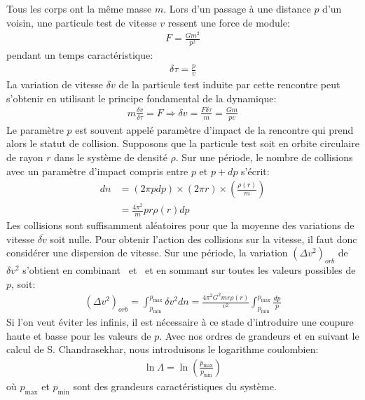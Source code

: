 Tous les corps ont la même masse $m$. Lors d'un passage à une distance $p$ d'un voisin, une particule test de vitesse $v$ ressent une force de module:
\begin{align*}
	F=\frac{Gm^{2}}{p^{2}}%
\end{align*}
pendant un temps caractéristique:
\begin{align*}
	\delta\tau=\frac{p}{v}
\end{align*}
La variation de vitesse $\delta v$ de la particule test induite par cette rencontre peut s'obtenir en utilisant le principe fondamental de la dynamique:
\begin{align}
	m\frac{\delta v}{\delta\tau}=F\Rightarrow\delta v=\frac{F\delta\tau}{m}=\frac{Gm}{pv} \label{deltavrel}
\end{align}
Le paramètre $p$ est souvent appelé paramètre d'impact de la rencontre qui prend alors le statut de collision. Supposons que la particule test soit
en orbite circulaire de rayon $r$ dans le système de densité $\rho$. Sur une période, le nombre de collisions avec
un paramètre d'impact compris entre $p$ et $p+dp$ s'écrit:
\begin{align}
	dn  &= \left(  2\pi pdp\right)  \times\left(  2\pi r\right)  \times\left(\frac{\rho\left(  r\right)  }{m}\right) \label{dnrel}\\
	    &= \frac{4\pi^{2}}{m}pr\rho\left(  r\right)  dp
\end{align}
Les collisions sont suffisamment aléatoires pour que la moyenne des variations de vitesse $\overline{\delta v}$ soit nulle. Pour obtenir l'action des
collisions sur la vitesse, il faut donc considérer une dispersion de vitesse. Sur une période, la variation $\left(\Delta v^{2}\right)_{orb}$ de
$\delta v^{2}$ s'obtient en combinant~ et~ et en sommant sur toutes les valeurs possibles de $p$, soit:
\begin{align*}
	\left(\Delta v^{2}\right)_{orb}=\int_{p_{\min}}^{p_{\max}}\delta v^{2}dn=\frac{4\pi^{2}G^{2}mr\rho\left(r\right)}{v^{2}}\int_{p_{\min}}^{p_{\max}}\frac{dp}{p}
\end{align*}
Si l'on veut éviter les infinis, il est nécessaire à ce stade d'introduire une coupure haute et basse pour les valeurs de $p$. Avec nos ordres de
grandeurs et en suivant le calcul de S. Chandrasekhar, nous introduisons le logarithme coulombien:
\begin{align*}
	\ln\Lambda=\ln\left(\frac{p_{\max}}{p_{\min}}\right)
\end{align*}
où $p_\mathrm{max}$ et $p_\mathrm{min}$ sont des grandeurs caractéristiques du système.
